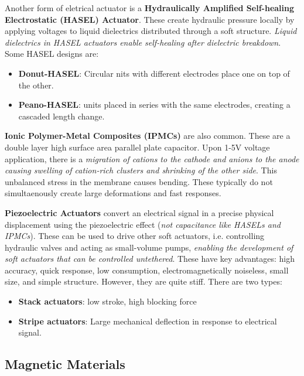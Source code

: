 \documentclass[onecolumn,a4paper]{article}
\begin{document}
Another form of eletrical actuator is a \textbf{Hydraulically Amplified Self-healing Electrostatic (HASEL) Actuator}. These create hydraulic pressure locally by applying voltages to liquid dielectrics distributed through a soft structure. \emph{Liquid dielectrics in HASEL actuators enable self-healing after dielectric breakdown}. Some HASEL designs are:
\begin{itemize}
    \item \textbf{Donut-HASEL}: Circular nits with different electrodes place one on top of the other.
    \item \textbf{Peano-HASEL}: units placed in series with the same electrodes, creating a cascaded length change.
\end{itemize}

\textbf{Ionic Polymer-Metal Composites (IPMCs)} are also common. These are a double layer high surface area parallel plate capacitor. Upon 1-5V voltage application, there is a \emph{migration of cations to the cathode and anions to the anode causing swelling of cation-rich clusters and shrinking of the other side}. This unbalanced stress in the membrane causes bending. These typically do not simultaenously create large deformations and fast responses.

\textbf{Piezoelectric Actuators} convert an electrical signal in a precise physical displacement using the piezoelectric effect (\emph{not capacitance like HASELs and IPMCs}). These can be used to drive other soft actuators, i.e. controlling hydraulic valves and acting as small-volume pumps, \emph{enabling the development of soft actuators that can be controlled untethered}. These have key advantages: high accuracy, quick response, low consumption, electromagnetically noiseless, small size, and simple structure. However, they are quite stiff. There are two types:
\begin{itemize}
    \item \textbf{Stack actuators}: low stroke, high blocking force
    \item \textbf{Stripe actuators}: Large mechanical deflection in response to electrical signal.
\end{itemize}

\subsection{Magnetic Materials}
\end{document}
